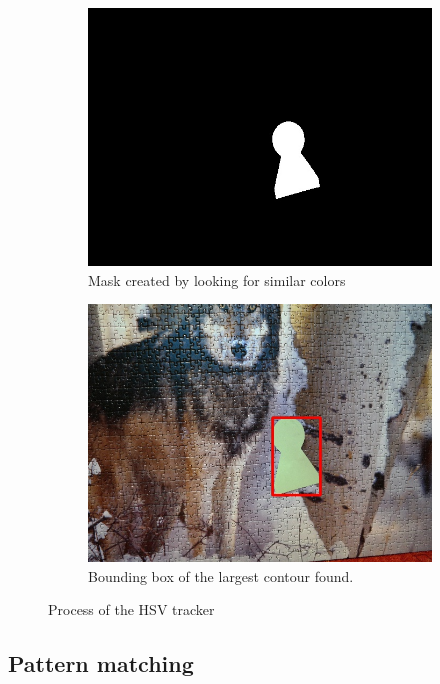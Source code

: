 \begin{figure}
\begin{subfigure}[b]{0.48\linewidth}
  \end{subfigure}
  \begin{subfigure}[b]{0.48\linewidth}
    \includegraphics[width=\linewidth]{img/hsv/mask.jpg}
    \caption{Mask created by looking for similar colors}
  \end{subfigure}
  \begin{subfigure}[b]{0.48\linewidth}
    \includegraphics[width=\linewidth]{img/hsv/result.jpg}
    \caption{Bounding box of the largest contour found.}
  \end{subfigure}
  \caption{Process of the HSV tracker}
  \label{fig:hsv-tracker}
\end{figure}

\subsection {Pattern matching}

